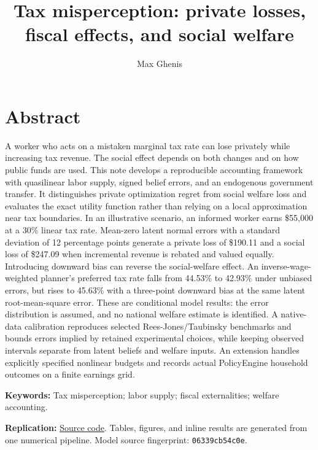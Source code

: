 \documentclass[
  11pt,
  letterpaper,
  DIV=11,
  numbers=noendperiod]{scrartcl}
\title{Tax misperception: private losses, fiscal effects, and social
welfare}
\author{Max Ghenis}
\date{}
\renewcommand*\contentsname{Table of contents}
\newcommand\contentsname{Table of contents}
\begin{document}
\maketitle

\renewcommand*\contentsname{Table of contents}
{
\setcounter{tocdepth}{3}
\tableofcontents
}

\section*{Abstract}\label{abstract}

A worker who acts on a mistaken marginal tax rate can lose privately
while increasing tax revenue. The social effect depends on both changes
and on how public funds are used. This note develops a reproducible
accounting framework with quasilinear labor supply, signed belief
errors, and an endogenous government transfer. It distinguishes private
optimization regret from social welfare loss and evaluates the exact
utility function rather than relying on a local approximation near tax
boundaries. In an illustrative scenario, an informed worker earns
\$55,000 at a 30\% linear tax rate. Mean-zero latent normal errors with
a standard deviation of 12 percentage points generate a private loss of
\$190.11 and a social loss of \$247.09 when incremental revenue is
rebated and valued equally. Introducing downward bias can reverse the
social-welfare effect. An inverse-wage-weighted planner's preferred tax
rate falls from 44.53\% to 42.93\% under unbiased errors, but rises to
45.63\% with a three-point downward bias at the same latent
root-mean-square error. These are conditional model results: the error
distribution is assumed, and no national welfare estimate is identified.
A native-data calibration reproduces selected Rees-Jones/Taubinsky
benchmarks and bounds errors implied by retained experimental choices,
while keeping observed intervals separate from latent beliefs and
welfare inputs. An extension handles explicitly specified nonlinear
budgets and records actual PolicyEngine household outcomes on a finite
earnings grid.

\textbf{Keywords:} Tax misperception; labor supply; fiscal
externalities; welfare accounting.

\textbf{Replication:}
\href{https://github.com/MaxGhenis/disutility-of-uncertainty}{Source
code}. Tables, figures, and inline results are generated from one
numerical pipeline. Model source fingerprint: \texttt{06339cb54c0e}.
\end{document}
